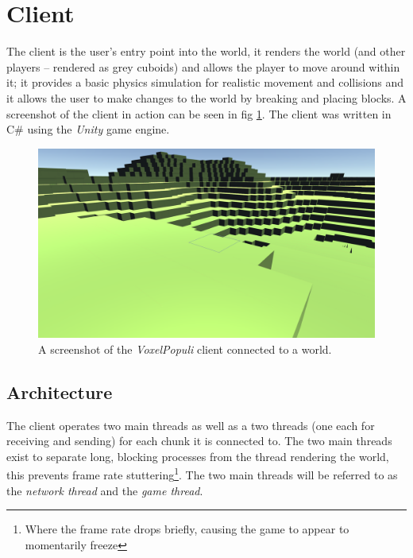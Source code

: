 \documentclass[12pt,notitlepage,a4paper]{report}
\newcommand{\unity}{\emph{Unity}}
\newcommand{\voxpop}{\emph{VoxelPopuli}}
\begin{document}
	\section{Client}
	\label{sec:client}
	The client is the user's entry point into the world, it renders the world (and other players -- rendered as grey cuboids) and allows the player to move around within it; it provides a basic physics simulation for realistic movement and collisions and it allows the user to make changes to the world by breaking and placing blocks. A screenshot of the client in action can be seen in fig \ref{fig:client}. The client was written in C\# using the \unity{} game engine.
	
	\begin{figure}
		\includegraphics[width=\textwidth]{client.png}
		\caption{A screenshot of the \voxpop{} client connected to a world.}
		\label{fig:client}
	\end{figure}
	
	\subsection{Architecture} %
	The client operates two main threads as well as a two threads (one each for receiving and sending) for each chunk it is connected to. The two main threads exist to separate long, blocking processes from the thread rendering the world, this prevents frame rate stuttering\footnote{Where the frame rate drops briefly, causing the game to appear to momentarily freeze}. The two main threads will be referred to as the \emph{network thread} and the \emph{game thread}.
	
\end{document}
